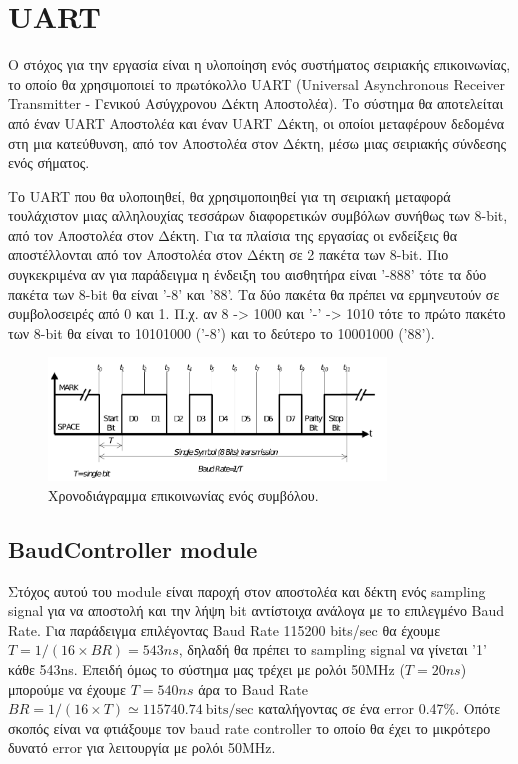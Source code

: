 \documentclass[../main.tex]{subfiles}
\begin{document}
\section{UART}

Ο στόχος για την εργασία είναι η υλοποίηση ενός συστήματος σειριακής
επικοινωνίας, το οποίο θα χρησιμοποιεί το πρωτόκολλο UART (Universal
Asynchronous Receiver Transmitter - Γενικού Ασύγχρονου Δέκτη Αποστολέα). Το
σύστημα θα αποτελείται από έναν UART Αποστολέα και έναν UART Δέκτη, οι οποίοι
μεταφέρουν δεδομένα στη μια κατεύθυνση, από τον Αποστολέα στον Δέκτη, μέσω μιας
σειριακής σύνδεσης ενός σήματος.

Το UART που θα υλοποιηθεί, θα χρησιμοποιηθεί για τη σειριακή μεταφορά
τουλάχιστον μιας αλληλουχίας τεσσάρων διαφορετικών συμβόλων συνήθως των 8-bit,
από τον Αποστολέα στον Δέκτη. Για τα πλαίσια της εργασίας οι ενδείξεις θα
αποστέλλονται από τον Αποστολέα στον Δέκτη σε 2 πακέτα των 8-bit. Πιο
συγκεκριμένα αν για παράδειγμα η ένδειξη του αισθητήρα είναι '-888' τότε τα δύο
πακέτα των 8-bit θα είναι '-8' και '88'. Τα δύο πακέτα θα πρέπει να ερμηνευτούν
σε συμβολοσειρές από 0 και 1. Π.χ. αν 8 -> 1000 και '-' -> 1010 τότε το πρώτο
πακέτο των 8-bit θα είναι το 10101000 ('-8') και το δεύτερο το 10001000 ('88').

\begin{figure}[H]
  \begin{center}
    \includegraphics[width=0.8\textwidth]{../images/example_uart_signal.png}
  \end{center}
  \caption{Χρονοδιάγραμμα επικοινωνίας ενός συμβόλου.}
  \label{fig:uart_example}
\end{figure}


\subsection{BaudController module}

Στόχος αυτού του module είναι παροχή στον αποστολέα και δέκτη ενός sampling
signal για να αποστολή και την λήψη bit αντίστοιχα ανάλογα με το επιλεγμένο Baud
Rate. Για παράδειγμα επιλέγοντας Baud Rate 115200 bits/sec θα έχουμε
$T=1/(16\times BR) = 543ns$, δηλαδή θα πρέπει το sampling signal να γίνεται '1'
κάθε 543ns. Επειδή όμως το σύστημα μας τρέχει με ρολόι 50MHz ($T=20ns$) μπορούμε
να έχουμε $T=540ns$ άρα το Baud Rate $BR = 1/(16\times T) \simeq
115740.74~\mathrm{bits/sec}$ καταλήγοντας σε ένα error 0.47\%. Οπότε σκοπός
είναι να φτιάξουμε τον baud rate controller το οποίο θα έχει το μικρότερο
δυνατό error για λειτουργία με ρολόι 50MHz.
\end{document}
